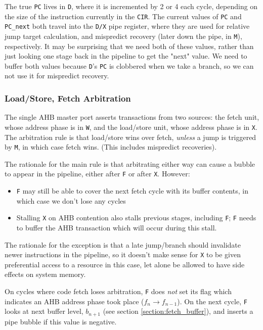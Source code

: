 \documentclass{article}
\begin{document}
The true \texttt{PC} lives in \texttt{D}, where it is incremented by 2 or 4 each cycle, depending on the size of the instruction currently in the \texttt{CIR}. The current values of \texttt{PC} and \texttt{PC\_next} both travel into the \texttt{D/X} pipe register, where they are used for relative jump target calculation, and mispredict recovery (later down the pipe, in \texttt{M}), respectively. It may be surprising that we need both of these values, rather than just looking one stage back in the pipeline to get the "next" value. We need to buffer both values because \texttt{D}'s \texttt{PC} is clobbered when we take a branch, so we can not use it for mispredict recovery.

\subsubsection{Load/Store, Fetch Arbitration}

The single AHB master port asserts transactions from two sources: the fetch unit, whose address phase is in \texttt{W}, and the load/store unit, whose address phase is in \texttt{X}. The arbitration rule is that load/store wins over fetch, \textit{unless} a jump is triggered by \texttt{M}, in which case fetch wins. (This includes mispredict recoveries).

The rationale for the main rule is that arbitrating either way can cause a bubble to appear in the pipeline, either after \texttt{F} or after \texttt{X}. However:

\begin{itemize}
	\item \texttt{F} may still be able to cover the next fetch cycle with its buffer contents, in which case we don't lose any cycles
	\item Stalling \texttt{X} on AHB contention also stalls previous stages, including \texttt{F}; \texttt{F} needs to buffer the AHB transaction which will occur during this stall.
\end{itemize}

The rationale for the exception is that a late jump/branch should invalidate newer instructions in the pipeline, so it doesn't make sense for \texttt{X} to be given preferential access to a resource in this case, let alone be allowed to have side effects on system memory.

On cycles where code fetch loses arbitration, \texttt{F} does \textit{not} set its flag which indicates an AHB address phase took place ($f_n \to f_{n-1}$). On the next cycle, \texttt{F} looks at next buffer level, $b_{n+1}$ (see section \ref{section:fetch_buffer}), and inserts a pipe bubble if this value is negative.
\end{document}
